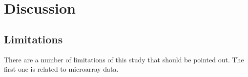 \chapter{Discussion}
\label{chp:b4}


\section{Limitations}

There are a number of limitations of this study that should be pointed out. The first one is related to microarray data. 